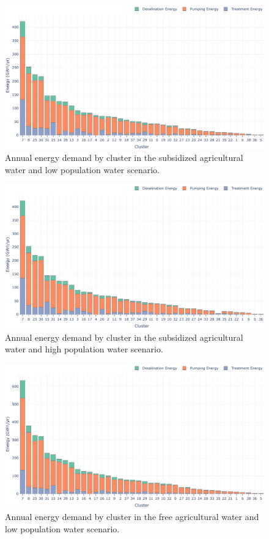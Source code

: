 \documentclass[12pt]{iopart}
\begin{document}
\begin{figure}[!h]
	\centering
	\includegraphics[width=\textwidth]{SubAgLowPopEnergyPerCluster}
	\caption{Annual energy demand by cluster in the subsidized agricultural water and low population water scenario.}
	\label{fig:SubAgLowPopEnergyPerCluster}
\end{figure}\newpage

\begin{figure}[!h]
	\centering
	\includegraphics[width=\textwidth]{SubAgHighPopEnergyPerCluster}
	\caption{Annual energy demand by cluster in the subsidized agricultural water and high population water scenario.}
	\label{fig:SubAgHighPopEnergyPerCluster}
\end{figure} 

\begin{figure}[!h]
	\centering
	\includegraphics[width=\textwidth]{FreeAgLowPopEnergyPerCluster}
	\caption{Annual energy demand by cluster in the free agricultural water and low population water scenario.}
	\label{fig:FreeAgLowPopEnergyPerCluster}
\end{figure}\newpage
\end{document}
